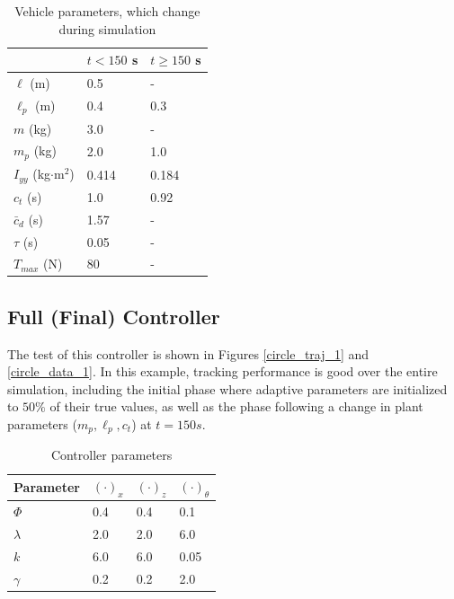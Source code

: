 \documentclass[letterpaper, 10 pt, conference]{ieeeconf}\usepackage[margin=1in]{geometry}
\begin{document}
\begin{table}[h!]
	\renewcommand{\arraystretch}{1.2}
	\centering
    \begin{tabular}{|lll|} \hline
    ~ & $t < 150$ s & $t \geq 150$ s \\ \hline
    $\ell$ (m) & 0.5 & - \\
    $\ell_p$ (m) & 0.4 & 0.3 \\
    $m$ (kg) & 3.0 & - \\
    $m_p$ (kg) & 2.0 & 1.0 \\
    $I_{yy}$ (kg$\cdot$m$^2$) & 0.414 & 0.184 \\ 
    $c_t$ (s) & 1.0 & 0.92 \\
    $\bar{c}_d$ (s) & 1.57 & - \\
    $\tau$ (s) & 0.05 & - \\
    $T_{max}$ (N) & 80 & - \\ \hline
    \end{tabular}
    \caption{Vehicle parameters, which change during simulation}
    \label{plant_params_appendix}
\end{table}

\subsection{Full (Final) Controller}
The test of this controller is shown in Figures \ref{circle_traj_1} and \ref{circle_data_1}. In this example, tracking performance is good over the entire simulation, including the initial phase where adaptive parameters are initialized to $50\%$ of their true values, as well as the phase following a change in plant parameters ($m_p, \ell_p, c_t$) at $t = 150s$.

\begin{table}[h!]
	\renewcommand{\arraystretch}{1.2}
	\centering
    \begin{tabular}{|llll|} \hline
    Parameter & $(\cdot)_x$ & $(\cdot)_z$ & $(\cdot)_\theta$ \\ \hline
    $\Phi$ & 0.4 & 0.4 & 0.1 \\    
    $\lambda$ & 2.0 & 2.0 & 6.0 \\
    $k$ & 6.0 & 6.0 & 0.05 \\
    $\gamma$ & 0.2 & 0.2 & 2.0 \\ \hline
    \end{tabular}
    \caption{Controller parameters}
    \label{ctrl_params_appendix}
\end{table}
\end{document}
